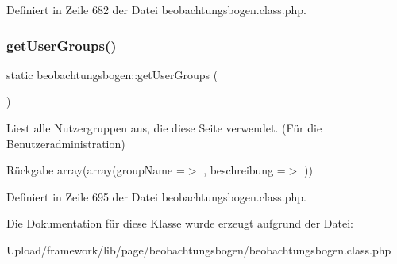 Definiert in Zeile 682 der Datei beobachtungsbogen.\+class.\+php.

\mbox{\label{classbeobachtungsbogen_a5a51d56bd2068eb864f45a5554f38b41}} 
\subsubsection{\texorpdfstring{get\+User\+Groups()}{getUserGroups()}}
{\footnotesize\ttfamily static beobachtungsbogen\+::get\+User\+Groups (\begin{DoxyParamCaption}{ }\end{DoxyParamCaption})\hspace{0.3cm}{\ttfamily [static]}}

Liest alle Nutzergruppen aus, die diese Seite verwendet. (Für die Benutzeradministration) \begin{DoxyReturn}{Rückgabe}
array(array(\textquotesingle{}group\+Name\textquotesingle{} =$>$ \textquotesingle{}\textquotesingle{}, \textquotesingle{}beschreibung\textquotesingle{} =$>$ \textquotesingle{}\textquotesingle{})) 
\end{DoxyReturn}


Definiert in Zeile 695 der Datei beobachtungsbogen.\+class.\+php.



Die Dokumentation für diese Klasse wurde erzeugt aufgrund der Datei\+:\begin{DoxyCompactItemize}
\item 
Upload/framework/lib/page/beobachtungsbogen/beobachtungsbogen.\+class.\+php\end{DoxyCompactItemize}
